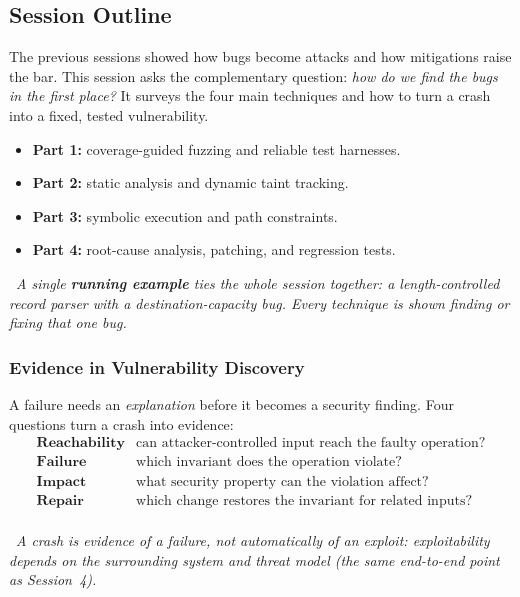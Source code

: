 \documentclass[hidelinks]{article}
\newcommand{\callout}[1]{\par\smallskip\noindent{\color{capri}$\blacktriangleright$}\ \textit{#1}\par\smallskip}
\begin{document}
\subsection{Session Outline}

The previous sessions showed how bugs become attacks and how mitigations raise the bar. This session asks the complementary question: \emph{how do we find the bugs in the first place?} It surveys the four main techniques and how to turn a crash into a fixed, tested vulnerability.
\begin{itemize}
    \item \textbf{Part 1:} coverage-guided fuzzing and reliable test harnesses.
    \item \textbf{Part 2:} static analysis and dynamic taint tracking.
    \item \textbf{Part 3:} symbolic execution and path constraints.
    \item \textbf{Part 4:} root-cause analysis, patching, and regression tests.
\end{itemize}

\callout{A single \textbf{running example} ties the whole session together: a \emph{length-controlled record parser} with a destination-capacity bug. Every technique is shown finding or fixing that one bug.}

\subsubsection{Evidence in Vulnerability Discovery}

A failure needs an \emph{explanation} before it becomes a security finding. Four questions turn a crash into evidence:
\[
\begin{array}{ll}
\textbf{Reachability} & \text{can attacker-controlled input reach the faulty operation?}\\
\textbf{Failure}      & \text{which invariant does the operation violate?}\\
\textbf{Impact}       & \text{what security property can the violation affect?}\\
\textbf{Repair}       & \text{which change restores the invariant for related inputs?}\\
\end{array}
\]

\callout{A crash is evidence of a \emph{failure}, not automatically of an \emph{exploit}: exploitability depends on the surrounding system and threat model (the same end-to-end point as Session~4).}
\end{document}
